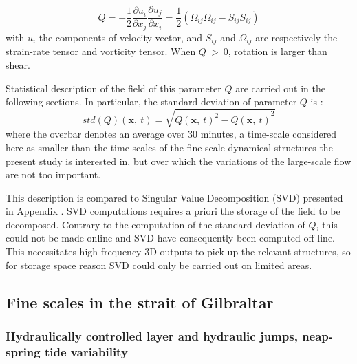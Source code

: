\begin{equation}
Q=-\frac{1}{2} \frac{\partial u_i}{\partial x_j} \frac{\partial u_j}{\partial x_i} = \frac{1}{2} (\Omega_{ij}\Omega_{ij} - S_{ij} S_{ij})
\end{equation}
with $u_i$ the components of velocity vector, and $S_{ij}$ and $\Omega_{ij}$ are respectively the strain-rate tensor and vorticity tensor. When $Q\ >\ 0$, rotation is larger than shear.

Statistical description of the field of this parameter $Q$ are carried out in the following sections. In particular, the standard deviation of parameter $Q$ is :
\begin{equation} 
\label{eqstdQ} 
    std ( Q ) (\mathbf{x},\ t)=  \sqrt{   \overline{Q (\mathbf{x},\ t)^{2}} -  \overline{Q(\mathbf{x},\ t)}^{2}  }
\end{equation}
where the overbar denotes an average over 30 minutes, a time-scale considered here as smaller than the time-scales of the fine-scale dynamical structures the present study is interested in, but over which the variations of the large-scale flow are not too important.

This description is compared to Singular Value Decomposition (SVD) presented in Appendix . SVD computations requires a priori the storage of the field to be decomposed. Contrary to the computation of the standard deviation of $Q$, this could not be made online and SVD have consequently been computed off-line. This necessitates high frequency 3D outputs to pick up the relevant structures, so for storage space reason SVD could only be carried out on limited areas.  


\subsection{Fine scales in the strait of Gilbraltar}
\label{section3DRes}

\subsubsection{Hydraulically controlled layer and hydraulic jumps, neap-spring tide variability}
\label{section3DResFlow}

